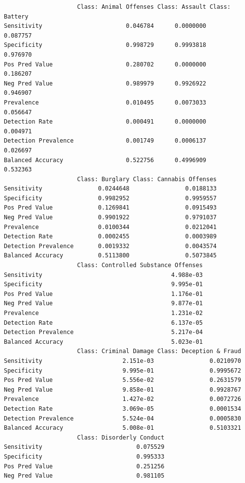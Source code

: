 \documentclass[
  article]{jss}
\begin{document}
\begin{verbatim}
                     Class: Animal Offenses Class: Assault Class: Battery
Sensitivity                        0.046784      0.0000000       0.087757
Specificity                        0.998729      0.9993818       0.976970
Pos Pred Value                     0.280702      0.0000000       0.186207
Neg Pred Value                     0.989979      0.9926922       0.946907
Prevalence                         0.010495      0.0073033       0.056647
Detection Rate                     0.000491      0.0000000       0.004971
Detection Prevalence               0.001749      0.0006137       0.026697
Balanced Accuracy                  0.522756      0.4996909       0.532363
                     Class: Burglary Class: Cannabis Offenses
Sensitivity                0.0244648                0.0188133
Specificity                0.9982952                0.9959557
Pos Pred Value             0.1269841                0.0915493
Neg Pred Value             0.9901922                0.9791037
Prevalence                 0.0100344                0.0212041
Detection Rate             0.0002455                0.0003989
Detection Prevalence       0.0019332                0.0043574
Balanced Accuracy          0.5113800                0.5073845
                     Class: Controlled Substance Offenses
Sensitivity                                     4.988e-03
Specificity                                     9.995e-01
Pos Pred Value                                  1.176e-01
Neg Pred Value                                  9.877e-01
Prevalence                                      1.231e-02
Detection Rate                                  6.137e-05
Detection Prevalence                            5.217e-04
Balanced Accuracy                               5.023e-01
                     Class: Criminal Damage Class: Deception & Fraud
Sensitivity                       2.151e-03                0.0210970
Specificity                       9.995e-01                0.9995672
Pos Pred Value                    5.556e-02                0.2631579
Neg Pred Value                    9.858e-01                0.9928767
Prevalence                        1.427e-02                0.0072726
Detection Rate                    3.069e-05                0.0001534
Detection Prevalence              5.524e-04                0.0005830
Balanced Accuracy                 5.008e-01                0.5103321
                     Class: Disorderly Conduct
Sensitivity                           0.075529
Specificity                           0.995333
Pos Pred Value                        0.251256
Neg Pred Value                        0.981105

\end{verbatim}
\end{document}
